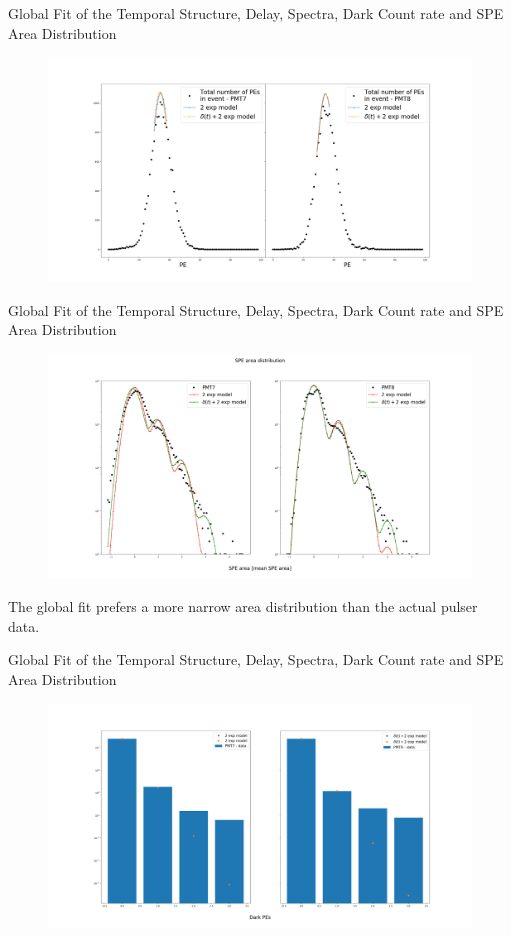 \documentclass{beamer}
\begin{document}
\begin{frame}{Global Fit of the Temporal Structure, Delay, Spectra, Dark Count rate and SPE Area Distribution}
\begin{figure}[h]
\includegraphics[width=1\textwidth]{spectra_fit.png}
\end{figure}
\end{frame}

\begin{frame}{Global Fit of the Temporal Structure, Delay, Spectra, Dark Count rate and SPE Area Distribution}
\begin{figure}[h]
\includegraphics[width=1\textwidth]{area_fit.png}
\end{figure}
The global fit prefers a more narrow area distribution than the actual pulser data.
\end{frame}

\begin{frame}{Global Fit of the Temporal Structure, Delay, Spectra, Dark Count rate and SPE Area Distribution}
\begin{figure}[h]
\includegraphics[width=1\textwidth]{DC_fit.png}
\end{figure}
\end{frame}
\end{document}

